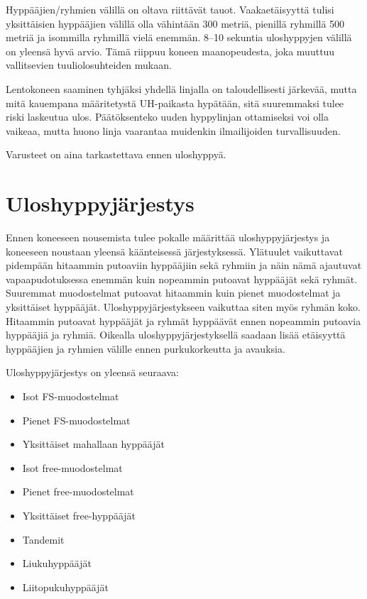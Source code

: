Hyppääjien/ryhmien välillä on oltava riittävät tauot. Vaakaetäisyyttä tulisi yksittäisien hyppääjien välillä olla vähintään 300 metriä, pienillä ryhmillä 500 metriä ja isommilla ryhmillä vielä enemmän. 8–10 sekuntia uloshyppyjen välillä on yleensä hyvä arvio. Tämä riippuu koneen maanopeudesta, joka muuttuu vallitsevien tuuliolosuhteiden mukaan.  


Lentokoneen saaminen tyhjäksi yhdellä linjalla on taloudellisesti järkevää, mutta mitä kauempana määritetystä UH-paikasta hypätään, sitä suuremmaksi tulee riski laskeutua ulos. Päätöksenteko uuden hyppylinjan ottamiseksi voi olla vaikeaa, mutta huono linja vaarantaa muidenkin ilmailijoiden turvallisuuden. 


Varusteet on aina tarkastettava ennen uloshyppyä. 

\section{ Uloshyppyjärjestys }
\label{uloshyppypaikan-maaritys-uloshyppyjarjestys}


Ennen koneeseen nousemista tulee pokalle määrittää uloshyppyjärjestys ja koneeseen noustaan yleensä käänteisessä järjestyksessä. Ylätuulet vaikuttavat pidempään hitaammin putoaviin hyppääjiin sekä ryhmiin ja näin nämä ajautuvat vapaapudotuksessa enemmän kuin nopeammin putoavat hyppääjät sekä ryhmät. Suuremmat muodostelmat putoavat hitaammin kuin pienet muodostelmat ja yksittäiset hyppääjät. Uloshyppyjärjestykseen vaikuttaa siten myös ryhmän koko. Hitaammin putoavat hyppääjät ja ryhmät hyppäävät ennen nopeammin putoavia hyppääjiä ja ryhmiä. Oikealla uloshyppyjärjestyksellä saadaan lisää etäisyyttä hyppääjien ja ryhmien välille ennen purkukorkeutta ja avauksia. 


Uloshyppyjärjestys on yleensä seuraava: 

\begin{itemize}
\item  Isot FS-muodostelmat 
\item  Pienet FS-muodostelmat 
\item  Yksittäiset mahallaan hyppääjät 
\item  Isot free-muodostelmat 
\item  Pienet free-muodostelmat 
\item  Yksittäiset free-hyppääjät 
\item  Tandemit 
\item  Liukuhyppääjät 
\item  Liitopukuhyppääjät 
\end{itemize}

